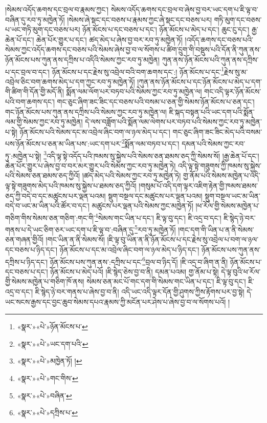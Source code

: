 །སེམས་འདོད་ཆགས་དང་བྲལ་བ་རྣམས་ཀྱང་། སེམས་འདོད་ཆགས་དང་བྲལ་བ་ཞེས་བྱ་བར་ཡང་དག་པ་ཇི་ལྟ་བ་བཞིན་དུ་རབ་ཏུ་མཁྱེན་ཏོ། །སེམས་ཞེ་སྡང་དང་བཅས་པ་རྣམས་ཀྱང་ཞེ་སྡང་དང་བཅས་པར། གཏི་མུག་དང་བཅས་པ་ཡང་གཏི་མུག་དང་བཅས་པར། ཉོན་མོངས་པ་དང་བཅས་པ་དང་། ཉོན་མོངས་པ་མེད་པ་དང་། ཆུང་ངུ་དང་། རྒྱ་ཆེན་པོ་དང་། ཆེན་པོར་གྱུར་པ་དང་། ཚད་མེད་པ་ཞེས་བྱ་བར་རབ་ཏུ་མཁྱེན་ཏོ། །འདོད་ཆགས་དང་བཅས་པའི་སེམས་ཀྱང་འདོད་ཆགས་དང་བཅས་པའི་སེམས་ཞེས་བྱ་བ་ལ་སོགས་པ་ཚིག་དྲུག་གི་བསྡུས་པའི་དོན་ནི་ཀུན་ནས་ཉོན་མོངས་པས་ཀུན་ནས་དཀྲིས་པ་འདིའི་སེམས་ཀྱང་རབ་ཏུ་མཁྱེན། ཀུན་ནས་ཉོན་མོངས་པའི་ཀུན་ནས་དཀྲིས་པ་དང་བྲལ་བ་དང་། ཉོན་མོངས་པ་དང་རྗེས་སུ་འབྲེལ་བའི་བག་ཆགས་དང་:། ཉོན་མོངས་པ་དང་\footnote{«སྣར་»«པེ་»ཉོན་མོངས་པ་}རྗེས་སུ་མ་འབྲེལ་ཅིང་བག་ཆགས་མེད་པ་དག་ཀྱང་རབ་ཏུ་མཁྱེན་ཏོ། །ཀུན་ནས་ཉོན་མོངས་པ་དང་ཉོན་མོངས་པ་མེད་པ་དག་གི་ཚིག་གི་དོན་གྱི་མདོ་ནི། སྨོན་ལམ་ལོག་པར་བཏབ་པའི་སེམས་ཀྱང་རབ་ཏུ་མཁྱེན་ལ། གང་འདི་ལྟར་ཉོན་མོངས་པའི་བག་ཆགས་དང་། གང་ཅུང་ཞིག་ཟང་ཟིང་དང་བཅས་པའི་བསམ་པ་ཅན་གྱི་སེམས་ཉོན་མོངས་པ་ཅན་དང་། གང་ཉོན་མོངས་པས་ཀུན་ནས་དཀྲིས་པའི་སེམས་ཀྱང་རབ་ཏུ་མཁྱེན་ལ། ཇི་སྐད་བསྟན་པའི་ཡང་དག་པའི་སྨོན་ལམ་གྱི་སེམས་ཀྱང་རབ་ཏུ་མཁྱེན། དེ་ལས་བཟློག་པའི་སྨོན་ལམ་ལེགས་པར་བཏབ་པའི་སེམས་ཀྱང་རབ་ཏུ་མཁྱེན་པ་སྟེ། ཉོན་མོངས་པའི་སེམས་དང་མ་འབྲེལ་ཞིང་བག་ལ་ཉལ་མེད་པ་དང་། གང་ཅུང་ཞིག་ཟང་ཟིང་མེད་པའི་བསམ་པས་ཉོན་མོངས་པ་ཅན་མ་ཡིན་པས་:ཡང་དག་པར་\footnote{«སྣར་»«པེ་»ཡང་དག་པའི་}སྨོན་ལམ་བཏབ་པ་དང་། དམན་པའི་སེམས་ཀྱང་རབ་ཏུ་:མཁྱེན་པ་སྟེ། \footnote{«སྣར་»«པེ་»མཁྱེན་ཏོ། ། }འདི་ལྟ་སྟེ་འདོད་པའི་ཁམས་སུ་སྐྱེས་པའི་སེམས་ཅན་ཐམས་ཅད་ཀྱི་སེམས་སོ། །རྒྱ་ཆེན་པོ་དང་། ཆེན་པོར་གྱུར་པ་ཞེས་བྱ་བ་བར་མར་གྱུར་པའི་སེམས་ཀྱང་རབ་ཏུ་མཁྱེན་ཏེ། འདི་ལྟ་སྟེ་གཟུགས་ཀྱི་ཁམས་སུ་སྐྱེས་པའི་སེམས་ཅན་ཐམས་ཅད་ཀྱིའོ། །ཚད་མེད་པའི་སེམས་ཀྱང་རབ་ཏུ་མཁྱེན་ཏེ། གྱ་ནོམ་པའི་སེམས་མཁྱེན་པ་འདི་ལྟ་སྟེ་གཟུགས་མེད་པའི་ཁམས་སུ་སྐྱེས་པ་ཐམས་ཅད་ཀྱིའོ། །གསུམ་པོ་འདི་དག་ལྟར་འཇིག་རྟེན་གྱི་ཁམས་ཐམས་ཅད་ཀྱི་བདེ་བ་དང་མཚུངས་པར་ལྡན་པའམ། སྡུག་བསྔལ་དང་མཚུངས་པར་ལྡན་པའམ། སྡུག་བསྔལ་ཡང་མ་ཡིན་བདེ་བ་ཡང་མ་ཡིན་པའི་ཚོར་བ་དང་། མཚུངས་པར་ལྡན་པའི་སེམས་ཀྱང་མཁྱེན་ཏོ། །ཕ་རོལ་གྱི་སེམས་མཁྱེན་པ་གཅིག་གིས་སེམས་ཅན་གཅིག་:གང་གི་\footnote{«སྣར་»«པེ་»གང་གིས་}སེམས་གང་ཡིན་པ་དང་། ཇི་ལྟ་བུ་དང་། ཇི་འདྲ་བ་དང་། ཇི་སྙེད་ཉེ་བར་གནས་པ་དེ་ཡང་ཅིག་ཅར་ཡང་དག་པ་ཇི་ལྟ་བ་:བཞིན་དུ་\footnote{«སྣར་»«པེ་»བཞིན་}རབ་ཏུ་མཁྱེན་ཏོ། །གང་དག་གི་ཡིན་པ་ན་ནི་སེམས་ཅན་གཞན་གྱིའོ། །གང་ཡིན་ན་ནི་སེམས་སོ། །ཇི་ལྟ་བུ་ཡིན་ན་ནི་ཉོན་མོངས་པ་དང་རྗེས་སུ་འབྲེལ་པ་བག་ལ་ཉལ་དང་བཅས་པ་ཉིད་དང་། ཉོན་མོངས་པ་དང་མ་འབྲེལ་ཞིང་བག་ལ་ཉལ་མེད་པ་ཉིད་དང་། ཉོན་མོངས་པས་ཀུན་ནས་དཀྲིས་པ་ཉིད་དང་། ཉོན་མོངས་པས་ཀུན་ནས་:དཀྲིས་པ་དང་\footnote{«སྣར་»«པེ་»དཀྲིས་པ་}བྲལ་བ་ཉིད་དོ། །ཇི་འདྲ་བ་ཞིག་ན་ནི། ཉོན་མོངས་པ་དང་བཅས་པ་དང་། ཉོན་མོངས་པ་མེད་པའོ། །ཇི་སྙེད་ཅེས་བྱ་བ་ནི། དམན་པའམ། གྱ་ནོམ་པ་སྟེ། དེ་ལྟ་བུའི་ཕ་རོལ་གྱི་སེམས་མཁྱེན་པ་གཅིག་ཁོ་ནས། སེམས་ཅན་མང་པོ་གང་དག་གི་སེམས་གང་ཡིན་པ་དང་། ཇི་ལྟ་བུ་དང་། ཇི་འདྲ་བ་དང་། ཇི་སྙེད་ཉེ་བར་གནས་པ་ཞེས་བྱ་བ་ནི། འདི་ཡང་འདི་ལྟར་དོན་གྱི་ཤུགས་ཀྱིས་རྟོགས་པར་བྱ་སྟེ། དེ་ཡང་སངས་རྒྱས་དང་བྱང་ཆུབ་སེམས་དཔའ་རྣམས་ཀྱི་མངོན་པར་ཤེས་པ་ཞེས་བྱ་བ་ལ་སོགས་པའོ། །
